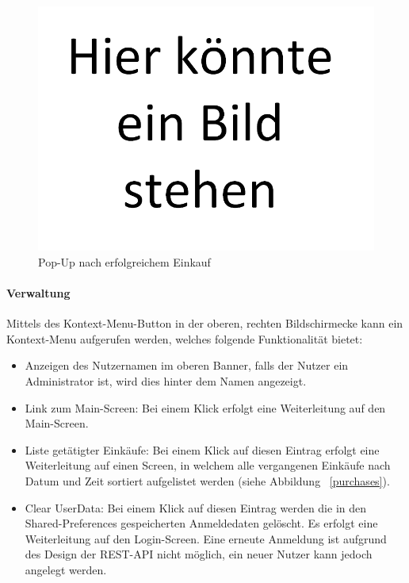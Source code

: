 \documentclass{scrartcl}
\begin{document}
		\begin{figure}[!h]
			\centering
			\includegraphics[scale=0.5]{./figures/placeholder.png}
			\caption{Pop-Up nach erfolgreichem Einkauf}
			\label{purchaseSuccess}
		\end{figure}
		
		\paragraph*{Verwaltung}
		Mittels des Kontext-Menu-Button in der oberen, rechten Bildschirmecke kann ein Kontext-Menu aufgerufen werden, welches folgende Funktionalität bietet:
		
		\begin{itemize}
			\item Anzeigen des Nutzernamen im oberen Banner, falls der Nutzer ein Administrator ist, wird dies hinter dem Namen angezeigt.
			
			\item Link zum Main-Screen: Bei einem Klick erfolgt eine Weiterleitung auf den Main-Screen.
			
			\item Liste getätigter Einkäufe: Bei einem Klick auf diesen Eintrag erfolgt eine Weiterleitung auf einen Screen, in welchem alle vergangenen Einkäufe nach Datum und Zeit sortiert aufgelistet werden (siehe Abbildung ~\ref{purchases}).
			
			\item Clear UserData: Bei einem Klick auf diesen Eintrag werden die in den Shared-Preferences gespeicherten Anmeldedaten gelöscht. Es erfolgt eine Weiterleitung auf den Login-Screen. Eine erneute Anmeldung ist aufgrund des Design der REST-API nicht möglich, ein neuer Nutzer kann jedoch angelegt werden.
		\end{itemize}
	
\end{document}
